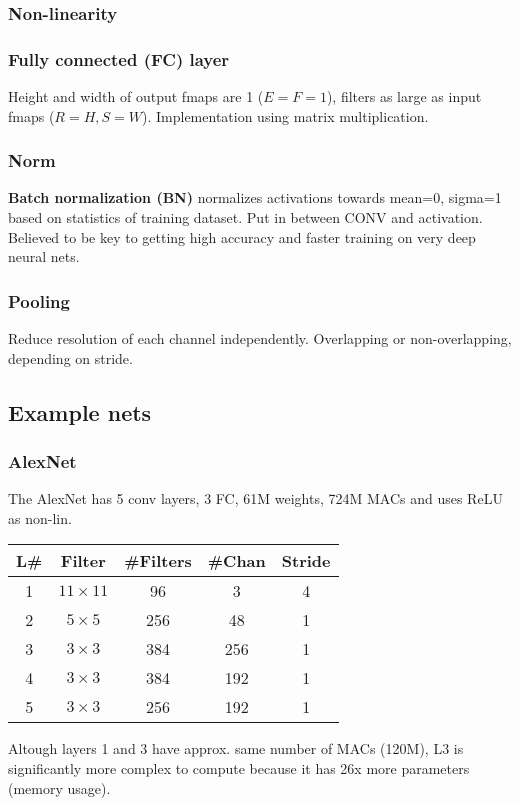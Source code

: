 \documentclass[a4paper, fontsize=8pt, landscape, DIV=1]{scrartcl}
\begin{document}
\begin{multicols*}{4}
  \subsubsection{Non-linearity}

  \subsubsection{Fully connected (FC) layer}
  Height and width of output fmaps are 1 ($E=F=1$), filters as large as input
  fmaps ($R=H,S=W$). Implementation using matrix multiplication.

  \subsubsection{Norm}
  \textbf{Batch normalization (BN)} normalizes activations towards mean=0, sigma=1
  based on statistics of training dataset. Put in between CONV and activation. Believed
  to be key to getting high accuracy and faster training on very deep neural nets.

  \subsubsection{Pooling}
  Reduce resolution of each channel independently. Overlapping or non-overlapping, 
  depending on stride.

  \subsection{Example nets}
  \subsubsection{AlexNet}
  The AlexNet has 5 conv layers, 3 FC, 61M weights, 724M MACs and uses ReLU as non-lin.
   \begin{tabularx}{\linewidth}{c c c c c}
    \hline
    L\# & Filter & \#Filters & \#Chan & Stride \\ \hline
    1&$11\times11$ & 96 & 3 & 4 \\
    2&$5\times5$ & 256 & 48 & 1 \\
    3&$3\times3$ & 384 & 256 & 1 \\
    4&$3\times3$ & 384 & 192 & 1 \\
    5&$3\times3$ & 256 & 192 & 1 \\ \hline
  \end{tabularx}
  Altough layers 1 and 3 have approx. same number of MACs (120M), L3 is significantly
  more complex to compute because it has 26x more parameters (memory usage).


\end{multicols*}
\end{document}
